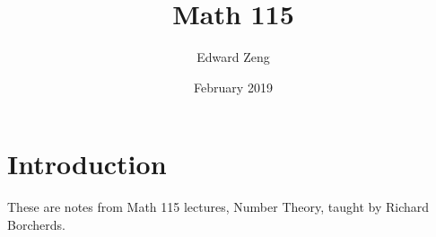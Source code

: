 \documentclass{article}
\title{Math 115}
\author{Edward Zeng}
\date{February 2019}
\begin{document}
\maketitle

\section{Introduction}
These are notes from Math 115 lectures, Number Theory, taught by Richard Borcherds.
\end{document}
